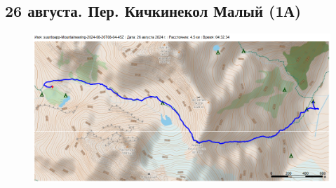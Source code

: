 \subsection{26 августа. Пер. Кичкинекол Малый (1А)}

\begin{figure}[h!]
	\centering
	\includegraphics[angle=0, width=0.3\linewidth]{../pics/mini_maps/26}
	\label{fig:mini_26}
\end{figure}

\newpage
